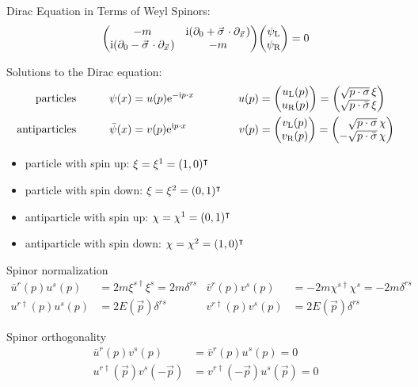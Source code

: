 			\noindent
			Dirac Equation in Terms of Weyl Spinors:
			\begin{equation}
				\label{Eq:DiracInTermsOfWeylSpinors}
				\mqty( -m & \i (\partial_0 + \vec{\sigma}\cdot\partial_{\vec{x}}) \\ \i (\partial_0 - \vec{\sigma}\cdot\partial_{\vec{x}}) & -m ) \mqty( \psi_\text{L} \\ \psi_\text{R} ) = 0
			\end{equation}

			\noindent
			Solutions to the Dirac equation:
			\begin{align}
				\text{particles}
				& \hsp
				\psi(x) = u(p) \ex^{-\i p \cdot x}
				& \hsp
				u(p) &= \mqty(
				u_\text{L}(p) \\
				u_\text{R}(p)
				) = \mqty(
				\sqrt{p\cdot\sigma}\,\xi \\
				\sqrt{p\cdot\bar{\sigma}}\,\xi
				) \\
				\text{antiparticles}
				& \hsp
				\bar{\psi}(x) = v(p) \ex^{\i p \cdot x}
				& \hsp
				v(p) &= \mqty(
				v_\text{L}(p) \\
				v_\text{R}(p)
				) = \mqty(
				\M\sqrt{p\cdot\sigma}\,\chi \\
				-\sqrt{p\cdot\bar{\sigma}}\,\chi
				)
			\end{align}
			\begin{itemize} \itemsep -0pt
				\item particle with spin up: $\xi=\xi^1 = (1, 0)^\intercal$
				\item particle with spin down: $\xi=\xi^2 = (0, 1)^\intercal$
				\item antiparticle with spin up: $\chi=\chi^1 = (0, 1)^\intercal$
				\item antiparticle with spin down: $\chi=\chi^2 = (1, 0)^\intercal$
			\end{itemize}

			\noindent
			Spinor normalization
			\begin{align}
				\bar{u}^r(p) u^s(p) &= 2m \xi^{s\dagger} \xi^s = 2m \delta^{rs}
				&
				\bar{v}^r(p) v^s(p) &= - 2m\chi^{s\dagger}\chi^s = - 2m\delta^{rs} \\
				u^{r\dagger}(p) u^s(p) &= 2E(\vec{p}) \delta^{rs}
				&
				v^{r\dagger}(p) v^s(p) &= 2E(\vec{p}) \delta^{rs}
			\end{align}

			\noindent
			Spinor orthogonality
			\begin{align}
				\bar{u}^r(p) v^s(p) &= \bar{v}^r(p) u^s(p) = 0 \\
				u^{r \dagger}(\vec{p}) v^s(-\vec{p}) &= v^{r \dagger}(-\vec{p}) u^s(\vec{p}) = 0
			\end{align}


